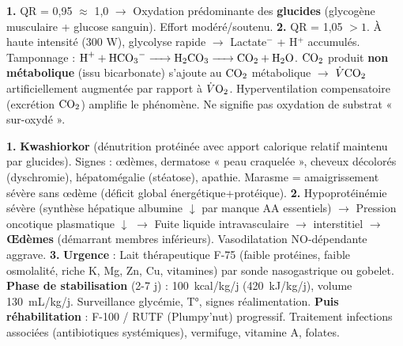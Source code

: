 \documentclass[11pt]{article}
\begin{document}
\begin{corrige}[Exercice 2]
\textbf{1.} QR = 0,95 $\approx$ 1,0 $\rightarrow$ Oxydation prédominante des \textbf{glucides} (glycogène musculaire + glucose sanguin). Effort modéré/soutenu.
\textbf{2.} QR = 1,05 $> 1$. À haute intensité (300 W), glycolyse rapide $\rightarrow$ Lactate$^-$ + H$^+$ accumulés. Tamponnage : $\ce{H+ + HCO3- -> H2CO3 -> CO2 + H2O}$. $\ce{CO2}$ produit \textbf{non métabolique} (issu bicarbonate) s'ajoute au $\ce{CO2}$ métabolique $\rightarrow$ $\dot{V}\ce{CO2}$ artificiellement augmentée par rapport à $\dot{V}\ce{O2}$. Hyperventilation compensatoire (excrétion $\ce{CO2}$) amplifie le phénomène. Ne signifie pas oxydation de substrat « sur-oxydé ».
\end{corrige}

\begin{corrige}[Exercice 3]
\textbf{1.} \textbf{Kwashiorkor} (dénutrition protéinée avec apport calorique relatif maintenu par glucides). Signes : œdèmes, dermatose « peau craquelée », cheveux décolorés (dyschromie), hépatomégalie (stéatose), apathie. Marasme = amaigrissement sévère sans œdème (déficit global énergétique+protéique).
\textbf{2.} Hypoprotéinémie sévère (synthèse hépatique albumine $\downarrow$ par manque AA essentiels) $\rightarrow$ Pression oncotique plasmatique $\downarrow$ $\rightarrow$ Fuite liquide intravasculaire $\rightarrow$ interstitiel $\rightarrow$ \textbf{Œdèmes} (démarrant membres inférieurs). Vasodilatation NO-dépendante aggrave.
\textbf{3.} \textbf{Urgence} : Lait thérapeutique F-75 (faible protéines, faible osmolalité, riche K, Mg, Zn, Cu, vitamines) par sonde nasogastrique ou gobelet. \textbf{Phase de stabilisation} (2-7 j) : \SI{100}{kcal/kg/j} (\SI{420}{kJ/kg/j}), volume \SI{130}{mL/kg/j}. Surveillance glycémie, T°, signes réalimentation. \textbf{Puis réhabilitation} : F-100 / RUTF (Plumpy'nut) progressif. Traitement infections associées (antibiotiques systémiques), vermifuge, vitamine A, folates.
\end{corrige}
\end{document}
